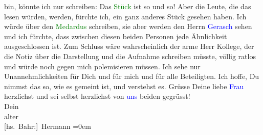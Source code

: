                bin, könnte ich nur schreiben: Das \textcolor{green}{Stück}{} ist so und so! Aber die Leute, die das lesen würden, werden, fürchte
               ich, ein ganz anderes Stück gesehen haben. Ich würde über den \textcolor{green}{Medardus}{} schreiben, sie aber werden den Herrn
                  \textcolor{blue}{Gerasch}{}\ledrightnote{\textcolor{blue}{Alfred Gerasch}} sehen und ich fürchte, dass zwischen
               diesen beiden Personen jede Ähnlichkeit ausgeschlossen ist. Zum Schluss wäre
               wahrscheinlich der arme Herr Kollege, der die Notiz über die Darstellung und die
               Aufnahme schreiben müsste, völlig ratlos und würde noch gegen mich polemisieren {\pb}müssen. Ich sehe nur Unannehmlichkeiten für Dich
               und für mich und für alle Beteiligten. Ich hoffe, Du nimmst das so, wie es gemeint
               ist, und verstehst es.\pend
           \pstart
           Grüsse Deine liebe \textcolor{blue}{Frau}{}
               herzlichst und sei selbst herzlichst von \textcolor{blue}{uns}{} beiden gegrüsst!{\\[\baselineskip]}Dein{\\[\baselineskip]}alter{\\[\baselineskip]}\spacefill\mbox{{[}hs. Bahr:{]} Hermann}\pend
           \leftskip=0em{}\endnumbering{}  
      